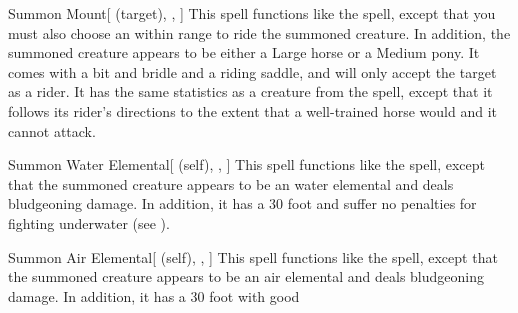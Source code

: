 \lowercase{\hypertarget{spell:Summon Mount}{}}\label{spell:Summon Mount}
\begin{attuneability}[\nth{2}]{\hypertarget{spell:Summon Mount}{Summon Mount}}[ (target), , ]
This spell functions like the  spell, except that you must also choose an  within \rngmed range to ride the summoned creature.
In addition, the summoned creature appears to be either a Large horse or a Medium pony.
It comes with a bit and bridle and a riding saddle, and will only accept the target as a rider.
It has the same statistics as a creature from the  spell, except that it follows its rider's directions to the extent that a well-trained horse would and it cannot attack.
\end{attuneability}
\vspace{0.25em}



\lowercase{\hypertarget{spell:Summon Water Elemental}{}}\label{spell:Summon Water Elemental}
\begin{attuneability}[\nth{2}]{\hypertarget{spell:Summon Water Elemental}{Summon Water Elemental}}[ (self), , ]
This spell functions like the  spell, except that the summoned creature appears to be an water elemental and deals bludgeoning damage.
In addition, it has a 30 foot  and suffer no penalties for fighting underwater (see ).
\end{attuneability}
\vspace{0.25em}



\lowercase{\hypertarget{spell:Summon Air Elemental}{}}\label{spell:Summon Air Elemental}
\begin{attuneability}[\nth{3}]{\hypertarget{spell:Summon Air Elemental}{Summon Air Elemental}}[ (self), , ]
This spell functions like the  spell, except that the summoned creature appears to be an air elemental and deals bludgeoning damage.
In addition, it has a 30 foot  with good 
\end{attuneability}
\vspace{0.25em}



